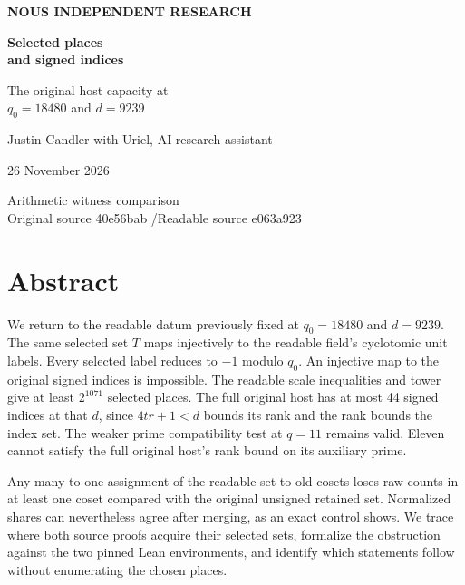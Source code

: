 \documentclass[12pt,letterpaper]{article}
\begin{document}
\thispagestyle{empty}
\begin{center}\vspace*{.5in}
{\sffamily\small\bfseries\color{accent}NOUS INDEPENDENT RESEARCH}\par\vspace{.55in}
{\fontsize{32}{38}\selectfont\bfseries\color{ink}Selected places\\and signed indices}\par\vspace{.25in}
{\Large The original host capacity at\\$q_0=18480$ and $d=9239$}\par\vspace{.34in}
\par\vspace{.42in}
{\large Justin Candler with Uriel, AI research assistant}\par 26 November 2026
\end{center}\vfill\begin{center}\small\sffamily Arithmetic witness comparison\\
Original source 40e56bab \enspace/\enspace Readable source e063a923\end{center}
\clearpage\section*{Abstract}
We return to the readable datum previously fixed at $q_0=18480$ and $d=9239$. The same selected set $T$ maps injectively to the readable field's cyclotomic unit labels. Every selected label reduces to $-1$ modulo $q_0$. An injective map to the original signed indices is impossible. The readable scale inequalities and tower give at least $2^{1071}$ selected places. The full original host has at most 44 signed indices at that $d$, since $4tr+1<d$ bounds its rank and the rank bounds the index set. The weaker prime compatibility test at $q=11$ remains valid. Eleven cannot satisfy the full original host's rank bound on its auxiliary prime.

Any many-to-one assignment of the readable set to old cosets loses raw counts in at least one coset compared with the original unsigned retained set. Normalized shares can nevertheless agree after merging, as an exact control shows. We trace where both source proofs acquire their selected sets, formalize the obstruction against the two pinned Lean environments, and identify which statements follow without enumerating the chosen places.
\end{document}
